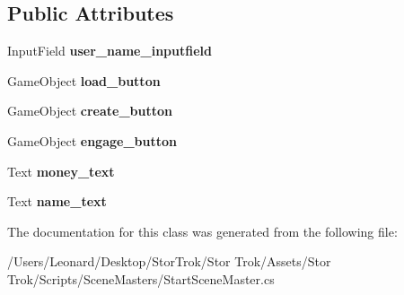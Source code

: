 \subsection*{Public Attributes}
\begin{DoxyCompactItemize}
\item 
\mbox{\label{class_start_scene_master_a213f912b755be0ad9a22b44ae245bf14}} 
Input\+Field {\bfseries user\+\_\+name\+\_\+inputfield}
\item 
\mbox{\label{class_start_scene_master_a1f89366008a128fe30062186c369779c}} 
Game\+Object {\bfseries load\+\_\+button}
\item 
\mbox{\label{class_start_scene_master_ae4f6a3a575faf3a90a501cea6a410bd8}} 
Game\+Object {\bfseries create\+\_\+button}
\item 
\mbox{\label{class_start_scene_master_a8f0afc9a2ba27679e2a16e37e8df2641}} 
Game\+Object {\bfseries engage\+\_\+button}
\item 
\mbox{\label{class_start_scene_master_adeb8b35cbf3521b598bd90d9bbfc24bd}} 
Text {\bfseries money\+\_\+text}
\item 
\mbox{\label{class_start_scene_master_a218dc39724b439a94f5e88598c6b5bf5}} 
Text {\bfseries name\+\_\+text}
\end{DoxyCompactItemize}


The documentation for this class was generated from the following file\+:\begin{DoxyCompactItemize}
\item 
/\+Users/\+Leonard/\+Desktop/\+Stor\+Trok/\+Stor Trok/\+Assets/\+Stor Trok/\+Scripts/\+Scene\+Masters/Start\+Scene\+Master.\+cs\end{DoxyCompactItemize}

